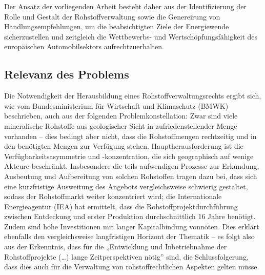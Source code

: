 \documentclass[12pt,a4paper,oneside]{book} %
\begin{document}
	Der Ansatz der vorliegenden Arbeit besteht daher aus der Identifizierung der Rolle und Gestalt der Rohstoffverwaltung sowie die Genereirung von Handlungsempfehlungen, um die beabsichtigten Ziele der Energiewende sicherzustellen und zeitgleich die Wettbewerbs- und Wertschöpfungsfähigkeit des europäischen Automobilsektors aufrechtzuerhalten.
	
	\subsection{Relevanz des Problems}
	Die Notwendigkeit der Herausbildung eines Rohstoffverwaltungsrechts ergibt sich, wie vom Bundesministerium für Wirtschaft und Klimaschutz (BMWK) beschrieben,\autocite{bundesministerium_fur_wirtschaft_und_klimaschutz_bmwk_industriepolitik_2023} auch aus der folgenden Problemkonstellation: Zwar sind viele mineralische Rohstoffe aus geologischer Sicht in zufriedenstellender Menge vorhanden – dies bedingt aber nicht, dass die Rohstoffmengen rechtzeitig und in den benötigten Mengen zur Verfügung stehen. Hauptherausforderung ist die Verfügbarkeitsasymmetrie und -konzentration, die sich geographisch auf wenige Akteure beschränkt. Insbesondere die teils aufwendigen Prozesse zur Erkundung, Ausbeutung und Aufbereitung von solchen Rohstoffen tragen dazu bei, dass sich eine kurzfristige Ausweitung des Angebots vergleichsweise schwierig gestaltet, sodass der Rohstoffmarkt weiter konzentriert wird; die Internationale Energieagentur (IEA) hat ermittelt, dass die Rohstoffprojektdurchführung zwischen Entdeckung und erster Produktion durchschnittlich 16 Jahre benötigt.\autocite[12]{international_energy_agency_role_2021} Zudem sind hohe Investitionen mit langer Kapitalbindung vonnöten.\autocite{FRenz 2025, 91} Dies erklärt ebenfalls den vergleichsweise langfristigen Horizont der Thematik – es folgt also aus der Erkenntnis, dass für die „Entwicklung und Inbetriebnahme der Rohstoffprojekte (…) lange Zeitperspektiven nötig” sind,\autocite[13]{bundesministerium_fur_wirtschaft_und_klimaschutz_bmwk_industriepolitik_2023} die Schlussfolgerung, dass dies auch für die Verwaltung von rohstoffrechtlichen Aspekten gelten müsse.
	
\end{document}
